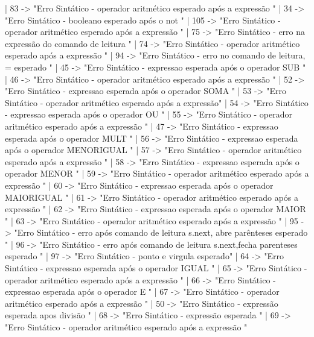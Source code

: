 \documentclass[12pt,a4paper,twoside]{report}
\begin{document}
\begin{terminal}
    | 83 ->
        "Erro Sintático - operador aritmético esperado após a expressão   \n"
    | 34 ->
        "Erro Sintático - booleano esperado após o not \n"
    | 105 ->
        "Erro Sintático - operador aritmético esperado após a expressão  \n"
    | 75 ->
        "Erro Sintático - erro na expressão do comando de leitura \n"
    | 74 ->
        "Erro Sintático - operador aritmético esperado após a expressão   \n"
    | 94 ->
        "Erro Sintático - erro no comando de leitura, = esperado \n"
    | 45 ->
        "Erro Sintático - expressao esperada após o operador SUB \n"
    | 46 ->
        "Erro Sintático - operador aritmético esperado após a expressão  \n"
    | 52 ->
        "Erro Sintático - expressao esperada após o operador SOMA \n"
    | 53 ->
        "Erro Sintático - operador aritmético esperado após a expressão\n"
    | 54 ->
        "Erro Sintático - expressao esperada após o operador OU \n"
    | 55 ->
        "Erro Sintático - operador aritmético esperado após a expressão \n"
    | 47 ->
        "Erro Sintático - expressao esperada após o operador MULT \n"
    | 56 ->
        "Erro Sintático - expressao esperada após o operador MENORIGUAL \n"
    | 57 ->
        "Erro Sintático - operador aritmético esperado após a expressão \n"
    | 58 ->
        "Erro Sintático - expressao esperada após o operador MENOR \n"
    | 59 ->
        "Erro Sintático - operador aritmético esperado após a expressão \n"
    | 60 ->
        "Erro Sintático - expressao esperada após o operador MAIORIGUAL \n"
    | 61 ->
        "Erro Sintático - operador aritmético esperado após a expressão \n"
    | 62 ->
        "Erro Sintático - expressao esperada após o operador MAIOR \n"
    | 63 ->
        "Erro Sintático - operador aritmético esperado após a expressão  \n"
    | 95 ->
        "Erro Sintático - erro após comando de leitura s.next, abre parênteses esperado \n"
    | 96 ->
        "Erro Sintático - erro após comando de leitura s.next,fecha parenteses esperado \n"
    | 97 ->
        "Erro Sintático - ponto e virgula esperado\n"
    | 64 ->
        "Erro Sintático - expressao esperada após o operador IGUAL \n"
    | 65 ->
        "Erro Sintático - operador aritmético esperado após a expressão \n"
    | 66 ->
        "Erro Sintático - expressao esperada após o operador E \n"
    | 67 ->
        "Erro Sintático - operador aritmético esperado após a expressão \n"
    | 50 ->
        "Erro Sintático - expressão esperada apos divisão \n"
    | 68 ->
        "Erro Sintático - expressão esperada \n"
    | 69 ->
        "Erro Sintático - operador aritmético esperado após a expressão \n"

\end{terminal}
\end{document}
